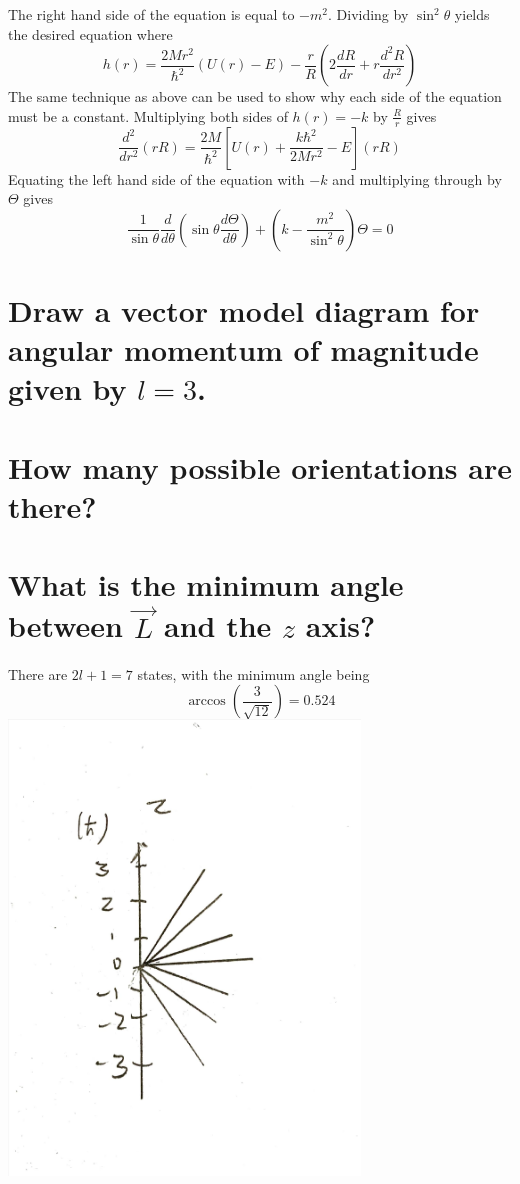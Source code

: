 \documentclass[answers]{exam}
\begin{document}
\begin{questions}
\begin{parts}
	\begin{solution}
		The right hand side of the equation is equal to $-m^2$. Dividing by $\sin^2\theta$ yields the desired equation where
		$$h(r) = \frac{2Mr^2}{\hbar^2}(U(r)-E) - \frac{r}{R}(2\frac{dR}{dr} + r\frac{d^2R}{dr^2})$$
		The same technique as above can be used to show why each side of the equation must be a constant. Multiplying both sides of $h(r) = -k$ by $\frac{R}{r}$ gives
		$$\frac{d^2}{dr^2}(rR) = \frac{2M}{\hbar^2}\left[U(r) + \frac{k\hbar^2}{2Mr^2}-E\right](rR)$$
		Equating the left hand side of the equation with $-k$ and multiplying through by $\Theta$ gives
		$$\frac{1}{\sin\theta}\frac{d}{d\theta}\left(\sin\theta\frac{d\Theta}{d\theta}\right) + \left(k - \frac{m^2}{\sin^2\theta}\right)\Theta = 0$$
	\end{solution}
\end{parts}

\question{}
\begin{parts}
	\part{Draw a vector model diagram for angular momentum of magnitude given by $l=3$.}
	\part{How many possible orientations are there?}
	\part{What is the minimum angle between $\vec{L}$ and the $z$ axis?}
\end{parts}

\begin{solution}
	There are $2l+1=7$ states, with the minimum angle being
	$$\arccos\left(\frac{3}{\sqrt{12}}\right) = 0.524$$
	\includegraphics[width=0.7\textwidth]{Fizz.pdf}
\end{solution}


\end{questions}
\end{document}
